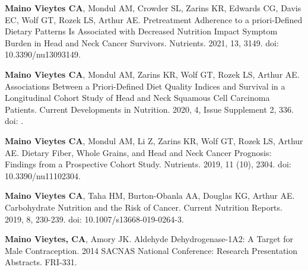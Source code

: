 \begin{cvskills}
  \cvskill
    {} %
    {\textbf{Maino Vieytes CA}, Mondul AM, Crowder SL, Zarins KR, Edwards CG, Davis EC, Wolf GT, Rozek LS, Arthur AE. Pretreatment Adherence to a priori-Defined Dietary Patterns Is Associated with Decreased Nutrition Impact Symptom Burden in Head and Neck Cancer Survivors. Nutrients. 2021, 13, 3149. doi: 10.3390/nu13093149.} %



  \cvskill
    {} %
    {\textbf{Maino Vieytes CA}, Mondul AM, Zarins KR, Wolf GT, Rozek LS, Arthur AE. Associations Between a Priori-Defined Diet Quality Indices and Survival in a Longitudinal Cohort Study of Head and Neck Squamous Cell Carcinoma Patients. Current Developments in Nutrition. 2020, 4, Issue Supplement 2, 336. doi: .} %



  \cvskill
    {} %
    {\textbf{Maino Vieytes CA}, Mondul AM, Li Z, Zarins KR, Wolf GT, Rozek LS, Arthur AE. Dietary Fiber, Whole Grains, and Head and Neck Cancer Prognosis: Findings from a Prospective Cohort Study. Nutrients. 2019, 11 (10), 2304. doi: 10.3390/nu11102304.} %



  \cvskill
    {} %
    {\textbf{Maino Vieytes CA}, Taha HM, Burton-Obanla AA, Douglas KG, Arthur AE. Carbohydrate Nutrition and the Risk of Cancer. Current Nutrition Reports. 2019, 8, 230-239. doi: 10.1007/s13668-019-0264-3.} %



  \cvskill
    {} %
    {\textbf{Maino Vieytes, CA}, Amory JK. Aldehyde Dehydrogenase-1A2: A Target for Male Contraception. 2014 SACNAS National Conference: Research Presentation Abstracts. FRI-331.} %


\end{cvskills}

